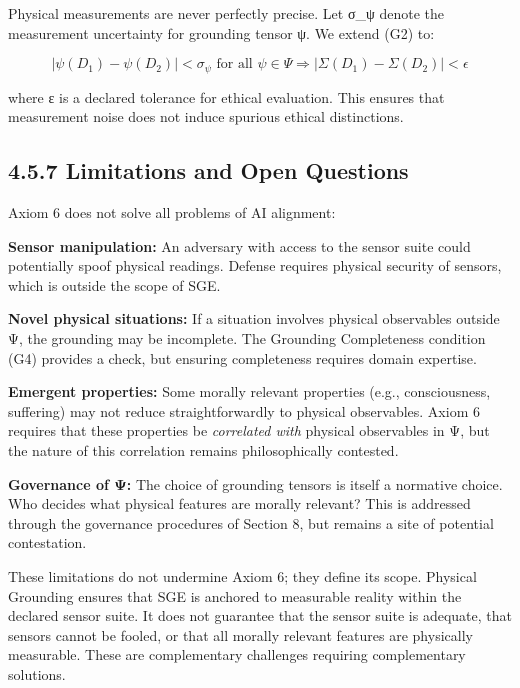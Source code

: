 \documentclass[12pt]{article}
\theoremstyle{plain}
\theoremstyle{definition}
\theoremstyle{remark}
\begin{document}
Physical measurements are never perfectly precise. Let σ\_ψ denote the
measurement uncertainty for grounding tensor ψ. We extend (G2) to:

\[\left| \psi\left( D_{1} \right) - \psi\left( D_{2} \right) \right| < \sigma_{\psi}\text{ for all }\psi \in \Psi \Longrightarrow \left| \Sigma\left( D_{1} \right) - \Sigma\left( D_{2} \right) \right| < \epsilon\]

where ε is a declared tolerance for ethical evaluation. This ensures
that measurement noise does not induce spurious ethical distinctions.

\subsection{4.5.7 Limitations and Open
Questions}\label{limitations-and-open-questions}

Axiom 6 does not solve all problems of AI alignment:

\textbf{Sensor manipulation:} An adversary with access to the sensor
suite could potentially spoof physical readings. Defense requires
physical security of sensors, which is outside the scope of SGE.

\textbf{Novel physical situations:} If a situation involves physical
observables outside Ψ, the grounding may be incomplete. The Grounding
Completeness condition (G4) provides a check, but ensuring completeness
requires domain expertise.

\textbf{Emergent properties:} Some morally relevant properties (e.g.,
consciousness, suffering) may not reduce straightforwardly to physical
observables. Axiom 6 requires that these properties be \emph{correlated
with} physical observables in Ψ, but the nature of this correlation
remains philosophically contested.

\textbf{Governance of Ψ:} The choice of grounding tensors is itself a
normative choice. Who decides what physical features are morally
relevant? This is addressed through the governance procedures of Section
8, but remains a site of potential contestation.

These limitations do not undermine Axiom 6; they define its scope.
Physical Grounding ensures that SGE is anchored to measurable reality
within the declared sensor suite. It does not guarantee that the sensor
suite is adequate, that sensors cannot be fooled, or that all morally
relevant features are physically measurable. These are complementary
challenges requiring complementary solutions.
\end{document}
